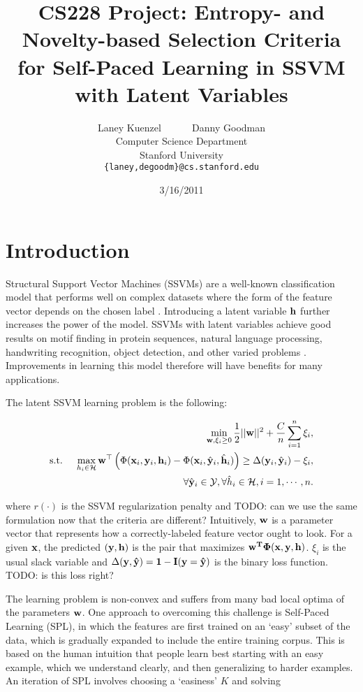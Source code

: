 \documentclass{article}
\title{CS228 Project: Entropy- and Novelty-based Selection Criteria for Self-Paced Learning in SSVM with Latent Variables}
\date{3/16/2011}
\author{
Laney Kuenzel ~~~~~ Danny Goodman\\
Computer Science Department \\
Stanford University \\
\texttt{\{laney,degoodm\}@cs.stanford.edu}
}
\newcommand{\mysection}[1]{\vspace{-4mm}\section{#1}\vspace{-4mm}}
\begin{document}
\maketitle
\vspace{-8mm}

\mysection{Introduction}
\label{sec:introduction}
Structural Support Vector Machines (SSVMs) are a well-known classification model that performs well on complex datasets where the form of the feature vector depends on the chosen label \cite{SSVM}.  Introducing a latent variable $\bf h$ further increases the power of the model.  SSVMs with latent variables achieve good results on motif finding in protein sequences, natural language processing, handwriting recognition, object detection, and other varied problems \cite{SPL}.  Improvements in learning this model therefore will have benefits for many applications.

The latent SSVM learning problem is the following\cite{SPL}:

\begin{eqnarray}
&&\min_{{\bf w},\xi_i \geq 0} \frac{1}{2}||{\bf w}||^2 + \frac{C}{n} \sum_{i=1}^n \xi_i, \nonumber \\
\mbox{s.t. } && \max_{h_i \in {\cal H}} {\bf w}^\top \left(\Phi({\bf x}_i,{\bf y}_i,{\bf h}_i) - 
		\Phi({\bf x}_i,\hat{\bf y}_i,\hat{\bf h}_i) \right)
	 \geq \Delta({\bf y}_i,\hat{\bf y}_i) - \xi_i, \nonumber \\
\label{eq:latentSSVM}
&&\forall \hat{\bf y}_i \in {\cal Y}, \forall \hat{h}_i \in {\cal H}, i=1,\cdots,n.
\end{eqnarray}

where $r(\cdot)$ is the SSVM regularization penalty and TODO: can we use the same formulation now that the criteria are different?  Intuitively, $\bf w$ is a parameter vector that represents how a correctly-labeled feature vector ought to look.  For a given $\bf x$, the predicted $(\bf y,\bf h)$ is the pair that maximizes $\bf{{w}} ^T \Phi(\bf x,\bf y,\bf h)$.  $\xi_i$ is the usual slack variable 
and $\Delta(\bf y,\hat{\bf y})=1-I(\bf y=\hat{\bf y})$ is the binary loss function. TODO: is this loss right?

The learning problem is non-convex and suffers from many bad local optima of the parameters $\bf w$.  One approach to overcoming this challenge is Self-Paced Learning (SPL), in which the features are first trained on an `easy' subset of the data, which is gradually expanded to include the entire training corpus\cite{SPL}.  This is based on the human intuition that people learn best starting with an easy example, which we understand clearly, and then generalizing to harder examples.  An iteration of SPL involves choosing a `easiness' $K$ and solving
\end{document}
